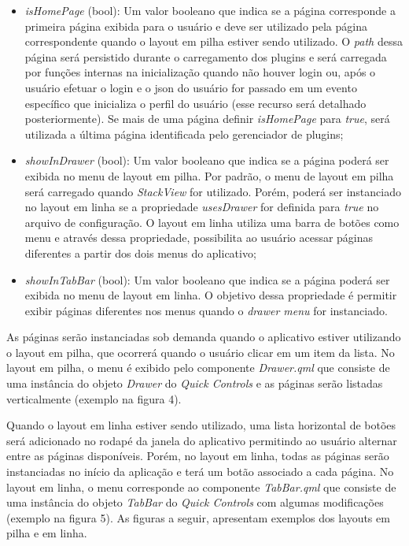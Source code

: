 \begin{itemize}
	\item \textit{isHomePage} (bool): Um valor booleano que indica se a página corresponde a primeira página exibida para o usuário e deve ser utilizado pela página correspondente quando o layout em pilha estiver sendo utilizado. O \textit{path} dessa página será persistido durante o carregamento dos plugins e será carregada por funções internas na inicialização quando não houver login ou, após o usuário efetuar o login e o json do usuário for passado em um evento específico que inicializa o perfil do usuário (esse recurso será detalhado posteriormente). Se mais de uma página definir \textit{isHomePage} para \textit{true}, será utilizada a última página identificada pelo gerenciador de plugins;

	\item \textit{showInDrawer} (bool): Um valor booleano que indica se a página poderá ser exibida no menu de layout em pilha. Por padrão, o menu de layout em pilha será carregado quando \textit{StackView} for utilizado. Porém, poderá ser instanciado no layout em linha se a propriedade \textit{usesDrawer} for definida para \textit{true} no arquivo de configuração. O layout em linha utiliza uma barra de botões como menu e através dessa propriedade, possibilita ao usuário acessar páginas diferentes a partir dos dois menus do aplicativo;

	\item \textit{showInTabBar} (bool): Um valor booleano que indica se a página poderá ser exibida no menu de layout em linha. O objetivo dessa propriedade é permitir exibir páginas diferentes nos menus quando o \textit{drawer menu} for instanciado.
\end{itemize}

As páginas serão instanciadas sob demanda quando o aplicativo estiver utilizando o layout em pilha, que ocorrerá quando o usuário clicar em um item da lista. No layout em pilha, o menu é exibido pelo componente \textit{Drawer.qml} que consiste de uma instância do objeto \textit{Drawer} do \textit{Quick Controls} e as páginas serão listadas verticalmente (exemplo na figura 4).\par

Quando o layout em linha estiver sendo utilizado, uma lista horizontal de botões será adicionado no rodapé da janela do aplicativo permitindo ao usuário alternar entre as páginas disponíveis. Porém, no layout em linha, todas as páginas serão instanciadas no início da aplicação e terá um botão associado a cada página. No layout em linha, o menu corresponde ao componente \textit{TabBar.qml} que consiste de uma instância do objeto \textit{TabBar} do \textit{Quick Controls} com algumas modificações (exemplo na figura 5). As figuras a seguir, apresentam exemplos dos layouts em pilha e em linha.

